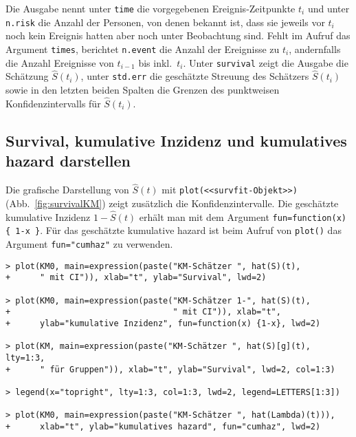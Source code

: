 Die Ausgabe nennt unter \lstinline!time! die vorgegebenen Ereignis-Zeitpunkte $t_{i}$ und unter \lstinline!n.risk! die Anzahl der Personen, von denen bekannt ist, dass sie jeweils vor $t_{i}$ noch kein Ereignis hatten aber noch unter Beobachtung sind. Fehlt im Aufruf das Argument \lstinline!times!, berichtet \lstinline!n.event! die Anzahl der Ereignisse zu $t_{i}$, andernfalls die Anzahl Ereignisse von $t_{i-1}$ bis inkl.\ $t_{i}$. Unter \lstinline!survival! zeigt die Ausgabe die Schätzung $\hat{S}(t_{i})$, unter \lstinline!std.err! die geschätzte Streuung des Schätzers $\hat{S}(t_{i})$ sowie in den letzten beiden Spalten die Grenzen des punktweisen Konfidenzintervalls für $\hat{S}(t_{i})$.

\subsection{Survival, kumulative Inzidenz und kumulatives hazard darstellen}

Die grafische Darstellung von $\hat{S}(t)$ mit \lstinline!plot(<<survfit-Objekt>>)! (Abb.\ \ref{fig:survivalKM}) zeigt zusätzlich die Konfidenzintervalle. Die geschätzte kumulative Inzidenz $1-\hat{S}(t)$ erhält man mit dem Argument \lstinline!fun=function(x) { 1-x }!. Für das geschätzte kumulative hazard ist beim Aufruf von \lstinline!plot()! das Argument \lstinline!fun="cumhaz"! zu verwenden.
\begin{lstlisting}
> plot(KM0, main=expression(paste("KM-Schätzer ", hat(S)(t),
+      " mit CI")), xlab="t", ylab="Survival", lwd=2)

> plot(KM0, main=expression(paste("KM-Schätzer 1-", hat(S)(t),
+                                 " mit CI")), xlab="t",
+      ylab="kumulative Inzidenz", fun=function(x) {1-x}, lwd=2)

> plot(KM, main=expression(paste("KM-Schätzer ", hat(S)[g](t), lty=1:3,
+      " für Gruppen")), xlab="t", ylab="Survival", lwd=2, col=1:3)

> legend(x="topright", lty=1:3, col=1:3, lwd=2, legend=LETTERS[1:3])

> plot(KM0, main=expression(paste("KM-Schätzer ", hat(Lambda)(t))),
+      xlab="t", ylab="kumulatives hazard", fun="cumhaz", lwd=2)
\end{lstlisting}


